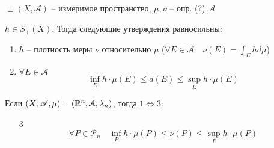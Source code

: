 \begin{theorem}

    $\sqsupset (X, \mathscr{A})$ -- измеримое пространство, $\mu, \nu$ -- опр. (?) $\mathscr{A}$

    $h\in S_+(X)$. Тогда следующие утверждения равносильны:
    \begin{enumerate}
        \item $h$ -- плотность меры $\nu$ относительно $\mu$ ($\forall E\in \mathscr A\quad \nu(E) = \int_E hd\mu$)
        \item $\forall E \in\mathscr{A}$
        \[\inf_E h \cdot \mu(E) \leqslant d(E) \leqslant \sup_E h \cdot \mu(E) \]
    \end{enumerate}

    Если $(X, \mathscr{A}, \mu) = (\mathbb{R}^n, \mathcal{A}, \lambda_n)$, тогда $1 \iff 3$:
    \begin{enumerate}
        \item [3] \[\forall P\in \mathcal P_n\quad \inf_P h\cdot \mu(P) \leqslant \nu(P) \leqslant \sup_P h\cdot \mu(P)\]
    \end{enumerate}
\end{theorem}
